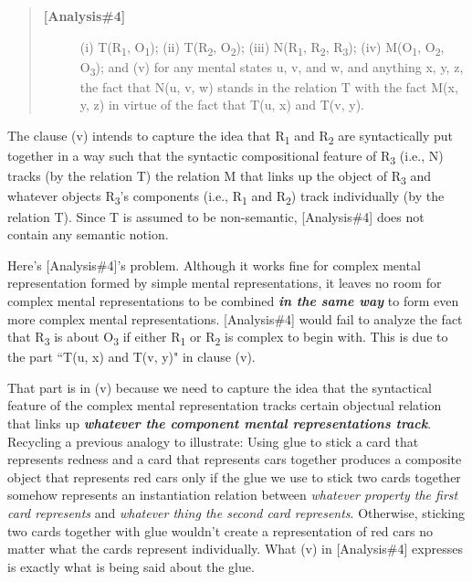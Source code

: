\documentclass[a4paper,12pt]{article}
\begin{document}
\begin{quote}
\begin{description}
\item[\textbf{[Analysis\#4]}] (i) T(R\textsubscript{1}, O\textsubscript{1}); (ii) T(R\textsubscript{2}, O\textsubscript{2}); (iii) N(R\textsubscript{1}, R\textsubscript{2}, R\textsubscript{3}); (iv) M(O\textsubscript{1}, O\textsubscript{2}, O\textsubscript{3}); and (v) for any mental states u, v, and w, and anything x, y, z, the fact that N(u, v, w) stands in the relation T with the fact M(x, y, z) in virtue of the fact that T(u, x) and T(v, y).
\end{description}
\end{quote}

The clause (v) intends to capture the idea that R\textsubscript{1} and R\textsubscript{2} are syntactically put together in a way such that the syntactic compositional feature of R\textsubscript{3} (i.e., N) tracks (by the relation T) the relation M that links up the object of R\textsubscript{3} and whatever objects R\textsubscript{3}'s components (i.e., R\textsubscript{1} and R\textsubscript{2}) track individually (by the relation T). Since T is assumed to be non-semantic, [Analysis\#4] does not contain any semantic notion.

Here's [Analysis\#4]'s problem. Although it works fine for complex mental representation formed by simple mental representations, it leaves no room for complex mental representations to be combined \textbf{\emph{in the same way}} to form even more complex mental representations. [Analysis\#4] would fail to analyze the fact that R\textsubscript{3} is about O\textsubscript{3} if either R\textsubscript{1} or R\textsubscript{2} is complex to begin with. This is due to the part ``T(u, x) and T(v, y)" in clause (v).

That part is in (v) because we need to capture the idea that the syntactical feature of the complex mental representation tracks certain objectual relation that links up \emph{\textbf{whatever the component mental representations track}}. Recycling a previous analogy to illustrate: Using glue to stick a card that represents redness and a card that represents cars together produces a composite object that represents red cars only if the glue we use to stick two cards together somehow represents an instantiation relation between \emph{whatever property the first card represents} and \emph{whatever thing the second card represents}. Otherwise, sticking two cards together with glue wouldn't create a representation of red cars no matter what the cards represent individually. What (v) in [Analysis\#4] expresses is exactly what is being said about the glue.
\end{document}
